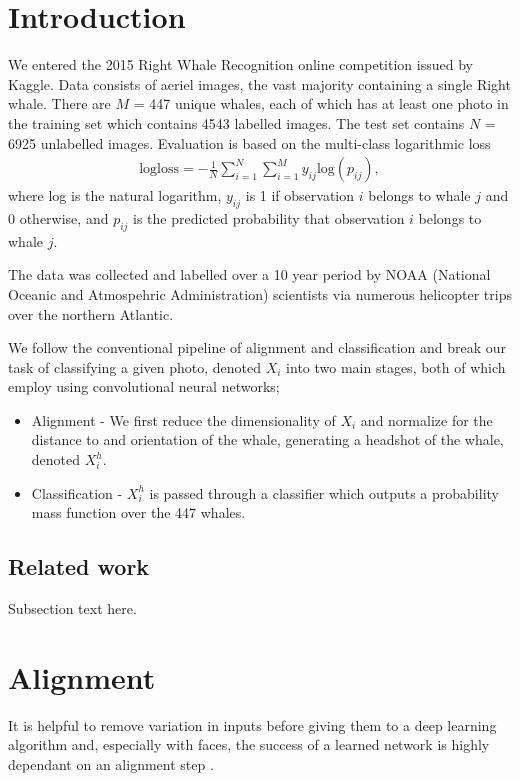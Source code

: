 \documentclass{IET}%
\begin{document}
\section{Introduction}
We entered the 2015 Right Whale Recognition online competition issued by Kaggle. Data consists of aeriel images, the vast majority containing a single Right whale. There are $M$ = 447 unique whales, each of which has at least one photo in the training set which contains 4543 labelled images. The test set contains $N$ = 6925 unlabelled images. Evaluation is based on the multi-class logarithmic loss
\begin{eqnarray}
\text{logloss} = - \frac{1}{N} \sum_{i=1}^{N} \sum_{i=1}^{M} y_{ij} \text{log}(p_{ij}),
\end{eqnarray}
where log is the natural logarithm, $y_{ij}$ is 1 if observation $i$ belongs to whale $j$ and 0 otherwise, and $p_{ij}$ is the predicted probability that observation $i$ belongs to whale $j$. 

The data was collected and labelled over a 10 year period by NOAA (National Oceanic and Atmospehric Administration) scientists via numerous helicopter trips over the northern Atlantic. 

We follow the conventional pipeline of alignment and classification and break our task of classifying a given photo, denoted $X_i$ into two main stages, both of which employ using convolutional neural networks;
\begin{itemize}
\item Alignment - We first reduce the dimensionality of $X_i$ and normalize for the distance to and orientation of the whale, generating a headshot of the whale, denoted $X_i^h$.
\item Classification - $X_i^h$ is passed through a classifier which outputs a probability mass function over the 447 whales.
\end{itemize}

\subsection{Related work}
Subsection text here.

\section{Alignment}

It is helpful to remove variation in inputs before giving them to a deep learning algorithm and, especially with faces, the success of a learned network is highly dependant on an alignment step \cite{lecun2012efficient,taigman2014deepface}. 
\end{document}
